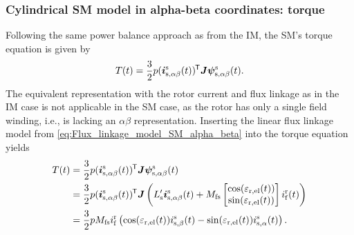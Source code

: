 \begin{frame}
	\frametitle{Cylindrical SM model in alpha-beta coordinates: torque}
	Following the same power balance approach as from the IM, the SM's torque equation is given by
	\begin{equation}
		T(t) = \frac{3}{2} p (\bm{i}_\mathrm{s,\alpha\beta}^\mathrm{s}(t))^{\mkern-1.5mu\mathsf{T}}\bm{J}\bm{\psi}_\mathrm{s,\alpha\beta}^\mathrm{s}(t).
	\end{equation}
	The equivalent representation with the rotor current and flux linkage as in the IM case is not applicable in the SM case, as the rotor has only a single field winding, i.e., is lacking an $\alpha\beta$ representation. Inserting the linear flux linkage model from \eqref{eq:Flux_linkage_model_SM_alpha_beta} into the torque equation yields
	\begin{equation}
		\begin{split}
			T(t) &= \frac{3}{2} p (\bm{i}_\mathrm{s,\alpha\beta}^\mathrm{s}(t))^{\mkern-1.5mu\mathsf{T}}\bm{J}\bm{\psi}_\mathrm{s,\alpha\beta}^\mathrm{s}(t)\\
			&= \frac{3}{2} p (\bm{i}_\mathrm{s,\alpha\beta}^\mathrm{s}(t))^{\mkern-1.5mu\mathsf{T}}\bm{J}\left(L'_\mathrm{s} \bm{i}^\mathrm{s}_{\mathrm{s},\alpha\beta}(t) + M_\mathrm{fs} \begin{bmatrix}\cos(\varepsilon_\mathrm{r,el}(t))\\ \sin(\varepsilon_\mathrm{r,el}(t))\end{bmatrix} i^\mathrm{r}_{\mathrm{f}}(t)\right)\\
			&= \frac{3}{2} p M_\mathrm{fs} i^\mathrm{r}_{\mathrm{f}} \left(\cos(\varepsilon_\mathrm{r,el}(t))i_{\mathrm{s,\beta}}^\mathrm{s}(t) - \sin(\varepsilon_\mathrm{r,el}(t))i_{\mathrm{s,\alpha}}^\mathrm{s}(t)\right).
		\end{split}
		\label{eq:SM_cylindrical_alphabeta_torque_equation}
	\end{equation}
\end{frame}


